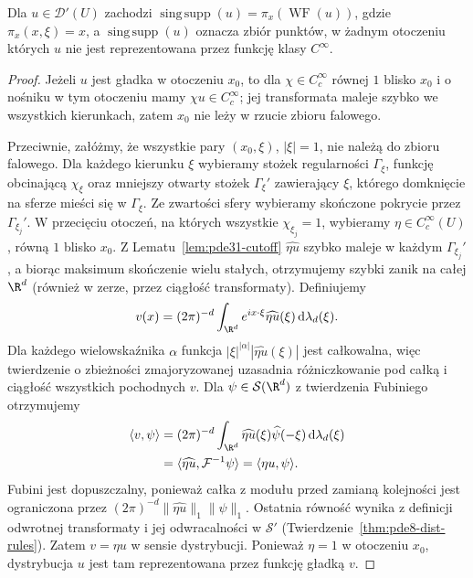\begin{stwierdzenie}\label{prop:pde31-singular-support}
Dla $u\in\mathcal D'(U)$ zachodzi
$\operatorname{sing\,supp}(u)=\pi_x(\operatorname{WF}(u))$,
gdzie $\pi_x(x,\xi)=x$, a $\operatorname{sing\,supp}(u)$
oznacza zbiór punktów, w żadnym otoczeniu których
$u$ nie jest reprezentowana przez funkcję klasy $C^\infty$.
\end{stwierdzenie}
\begin{proof}
Jeżeli $u$ jest gładka w otoczeniu $x_0$, to dla
$\chi\in C_c^\infty$ równej $1$ blisko $x_0$
i o nośniku w tym otoczeniu mamy
$\chi u\in C_c^\infty$; jej transformata maleje szybko we wszystkich
kierunkach, zatem $x_0$ nie leży w rzucie zbioru falowego.

Przeciwnie, załóżmy, że wszystkie pary $(x_0,\xi)$, $|\xi|=1$,
nie należą do zbioru falowego. Dla każdego kierunku $\xi$ wybieramy stożek
regularności $\Gamma_\xi$, funkcję obcinającą $\chi_\xi$
oraz mniejszy otwarty stożek $\Gamma_\xi'$
zawierający $\xi$, którego domknięcie na sferze
mieści się w $\Gamma_\xi$.
Ze zwartości sfery wybieramy skończone pokrycie
przez $\Gamma_{\xi_j}'$. W przecięciu otoczeń,
na których wszystkie $\chi_{\xi_j}=1$,
wybieramy $\eta\in C_c^\infty(U)$, równą $1$
blisko $x_0$. Z Lematu~\ref{lem:pde31-cutoff}
$\widehat{\eta u}$ szybko maleje w każdym
$\Gamma_{\xi_j}'$, a biorąc maksimum skończenie
wielu stałych, otrzymujemy szybki zanik na całej
$\R^d$ (również w zerze, przez ciągłość transformaty).
Definiujemy
\[
 v(x)=(2\pi)^{-d}\int_{\R^d}
 e^{ix\cdot\xi}\widehat{\eta u}(\xi)\,\mathrm d\lambda_d(\xi).
\]
Dla każdego wielowskaźnika $\alpha$ funkcja
$|\xi|^{|\alpha|}|\widehat{\eta u}(\xi)|$ jest całkowalna,
więc twierdzenie o zbieżności zmajoryzowanej
uzasadnia różniczkowanie pod całką i ciągłość
wszystkich pochodnych $v$.
Dla $\psi\in\mathcal S(\R^d)$ z twierdzenia
Fubiniego otrzymujemy
\[
 \begin{aligned}
 \langle v,\psi\rangle
 &=(2\pi)^{-d}\int_{\R^d}
 \widehat{\eta u}(\xi)\widehat\psi(-\xi)
 \,\mathrm d\lambda_d(\xi)\\
 &=\langle\widehat{\eta u},\mathcal F^{-1}\psi\rangle
 =\langle\eta u,\psi\rangle .
 \end{aligned}
\]
Fubini jest dopuszczalny, ponieważ całka z modułu
przed zamianą kolejności jest ograniczona przez
$(2\pi)^{-d}\|\widehat{\eta u}\|_1\|\psi\|_1$.
Ostatnia równość wynika z definicji odwrotnej
transformaty i jej odwracalności w $\mathcal S'$
(Twierdzenie~\ref{thm:pde8-dist-rules}).
Zatem $v=\eta u$ w sensie dystrybucji.
Ponieważ $\eta=1$ w otoczeniu $x_0$, dystrybucja
$u$ jest tam reprezentowana przez funkcję gładką $v$.
\end{proof}

